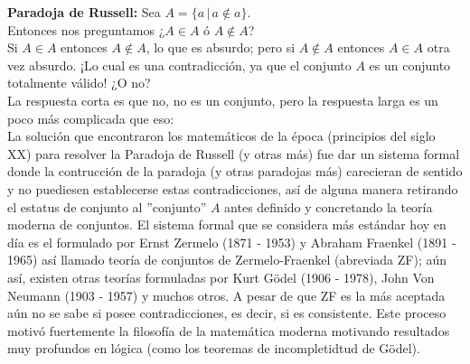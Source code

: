 \documentclass[12pt,a4paper]{book}
\begin{document}
\textbf{Paradoja de Russell:} Sea $A = \{ a \,\vert\, a \notin a\}$.\\ Entonces nos preguntamos ¿$A \in A$ ó $A \notin A$?\\Si $ A \in A $ entonces $A \notin A$, lo que es absurdo; pero si $ A \notin A $ entonces $A \in A$ otra vez absurdo. ¡Lo cual es una contradicción, ya que el conjunto $A$ es un conjunto totalmente válido! ¿O no?\\
La respuesta corta es que no, no es un conjunto, pero la respuesta larga es un poco más complicada que eso:\\
La solución que encontraron los matemáticos de la época (principios del siglo XX) para resolver la Paradoja de Russell (y otras más) fue dar un sistema formal donde la contrucción de la paradoja (y otras paradojas más) carecieran de sentido y no puediesen establecerse estas contradicciones, así de alguna manera retirando el estatus de conjunto al ''conjunto'' $A$ antes definido y concretando la teoría moderna de conjuntos. El sistema formal que se considera más estándar hoy en día es el formulado por Ernst Zermelo (1871 - 1953) y Abraham Fraenkel (1891 - 1965) así llamado teoría de conjuntos de Zermelo-Fraenkel (abreviada ZF); aún así, existen otras teorías formuladas por Kurt Gödel (1906 - 1978), John Von Neumann (1903 - 1957) y muchos otros. A pesar de que ZF es la más aceptada aún no se sabe si posee contradicciones, es decir, si es consistente. Este proceso motivó fuertemente la filosofía de la matemática moderna motivando resultados muy profundos en lógica (como los teoremas de incompletidtud de Gödel).

\ifx\isEmbedded\undefined
\end{document}
